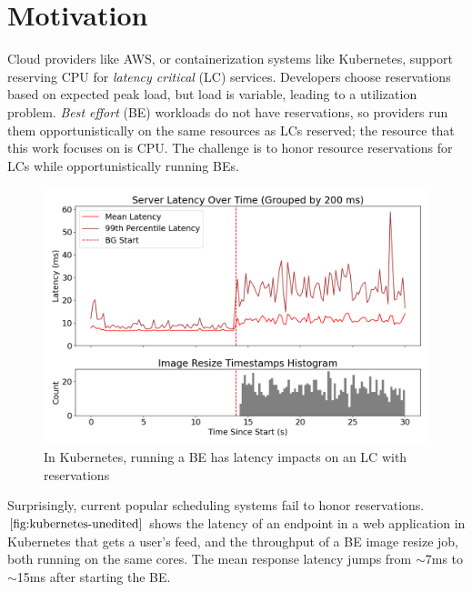 \section{Motivation}

Cloud providers like AWS, or containerization systems like Kubernetes, support
reserving CPU for \textit{latency critical} (LC) services. Developers choose
reservations based on expected peak load, but load is variable, leading to a
utilization problem. \textit{Best effort} (BE) workloads do not have
reservations, so providers run them opportunistically on the same resources as
LCs reserved; the resource that this work focuses on is CPU. The challenge is to
honor resource reservations for LCs while opportunistically running BEs.

\begin{figure}[t]
    \centering
    \includegraphics[width=0.9\columnwidth]{graphs/kubernetes-unedited.png}
    \caption{In Kubernetes, running a BE has latency impacts on an LC with
    reservations}\label{fig:kubernetes-unedited}
\end{figure}

Surprisingly, current popular scheduling systems fail to honor reservations.
$\autoref{fig:kubernetes-unedited}$ shows the latency of an endpoint in a web
application in Kubernetes that gets a user's feed, and the throughput of a BE
image resize job, both running on the same cores. The mean response latency
jumps from $\sim$7ms to $\sim$15ms after starting the BE.



